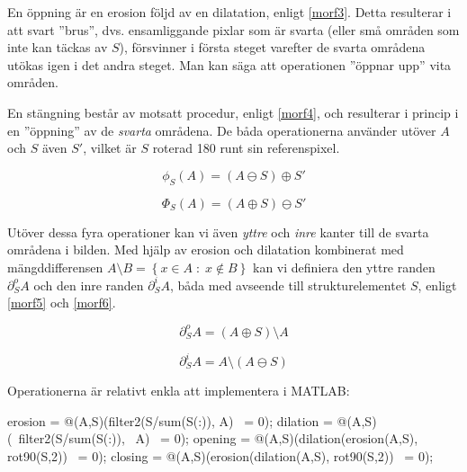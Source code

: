 \documentclass[../rapport_MVEX01-11-05]{subfiles}
\begin{document}
En öppning är en erosion följd av en dilatation, enligt \eqref{morf3}.
Detta resulterar i att svart ''brus'', dvs. ensamliggande pixlar som
är svarta (eller små områden som inte kan täckas av $S$), försvinner i
första steget varefter de svarta områdena utökas igen i det andra
steget. Man kan säga att operationen ''öppnar upp'' vita områden.

En stängning består av motsatt procedur, enligt \eqref{morf4}, och
resulterar i princip i en ''öppning'' av de \emph{svarta} områdena. De
båda operationerna använder utöver $A$ och $S$ även $S'$, vilket är
$S$ roterad 180\textdegree{} runt sin referenspixel.

\begin{equation}
  \label{morf3}
  \phi_S(A)=(A\ominus S)\oplus S'
\end{equation}

\begin{equation}
  \label{morf4}
  \Phi_S(A)=(A\oplus S)\ominus S'
\end{equation}

Utöver dessa fyra operationer kan vi även \emph{yttre} och \emph{inre}
kanter till de svarta områdena i bilden. Med hjälp av erosion och
dilatation kombinerat med mängddifferensen $A\setminus B=\left\{x\in
A\;:\;x\not\in B\right\}$ kan vi definiera den yttre randen
$\partial_S^o A$ och den inre randen $\partial_S^i A$, båda med
avseende till strukturelementet $S$, enligt \eqref{morf5} och
\eqref{morf6}.

\begin{equation}
  \label{morf5}
  \partial_S^o A = \left(A\oplus S\right)\setminus A
\end{equation}

\begin{equation}
  \label{morf6}
  \partial_S^i A = A\setminus\left(A\ominus S\right)
\end{equation}

Operationerna är relativt enkla att implementera i MATLAB:

\begin{code}
erosion = @(A,S)(filter2(S/sum(S(:)), A) ~= 0);
dilation = @(A,S)(~filter2(S/sum(S(:)), ~A) ~= 0);
opening = @(A,S)(dilation(erosion(A,S), rot90(S,2)) ~= 0);
closing = @(A,S)(erosion(dilation(A,S), rot90(S,2)) ~= 0);

\end{code}

\end{document}
